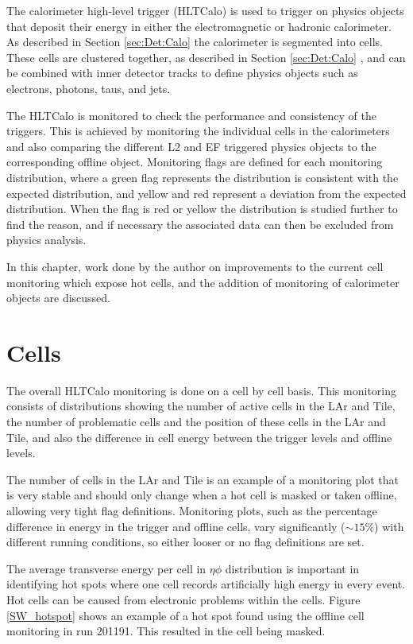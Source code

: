 The calorimeter high-level trigger (HLTCalo) is used to trigger on physics objects that deposit their energy in either the electromagnetic or hadronic calorimeter.
As described in Section \ref{sec:Det:Calo} the calorimeter is segmented into cells.
These cells are clustered together, as described in Section \ref{sec:Det:Calo} , and can be combined with inner detector tracks to define physics objects such as electrons, photons, taus, and jets. 

The HLTCalo is monitored to check the performance and consistency of the triggers. 
This is achieved by monitoring the individual cells in the calorimeters and also comparing the different L2 and EF triggered physics objects to the corresponding offline object.
Monitoring flags are defined for each monitoring distribution, where a green flag represents the distribution is consistent with the expected distribution, and yellow and red represent a deviation from the expected distribution. 
When the flag is red or yellow the distribution is studied further to find the reason, and if necessary the associated data can then be excluded from physics analysis.


In this chapter, work done by the author on improvements to the current cell monitoring which expose hot cells, and the addition of monitoring of calorimeter objects are discussed. 

\section{Cells}

The overall HLTCalo monitoring is done on a cell by cell basis.
This monitoring consists of distributions showing the number of active cells in the LAr and Tile, the number of problematic cells and the position of these cells in the LAr and Tile, and also the difference in cell energy between the trigger levels and offline levels.

The number of cells in the LAr and Tile is an example of a monitoring plot that is very stable and  should only change when a hot cell is masked or taken offline, allowing very tight flag definitions.
Monitoring plots, such as the percentage difference in energy in the trigger and offline cells, vary significantly ($\sim15\%$) with different running conditions, so either looser or no flag definitions are set.

The average transverse energy per cell in $\eta  \phi$ distribution is important in identifying hot spots where one cell records artificially high energy in every event.
Hot cells can be caused from electronic problems within the cells. 
Figure \ref{SW_hotspot} shows an example of a hot spot found using the offline cell monitoring in run 201191. 
This resulted in the cell being masked.

